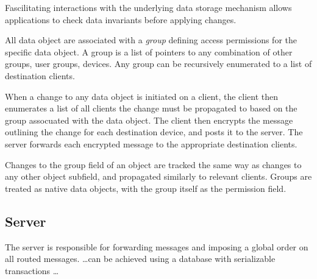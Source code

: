 Fascilitating interactions with the underlying data storage mechanism
allows \name{} applications to check data invariants before applying 
changes.
  

All data object are associated with a \textit{group} defining access 
permissions for the specific data object. A group is a list of pointers 
to any combination of other groups, user groups, devices. Any group
can be recursively enumerated to a list of destination clients. 

When a change to any data object is initiated on a client, the client
then enumerates a list of all clients the change must be propagated to
based on the group assocuated with the data object.
The client then encrypts the message outlining the change for each 
destination device, and posts it to the server. The server forwards
each encrypted message to the appropriate destination clients.

Changes to the group field of an object are tracked the same way as 
changes to any other object subfield, and propagated similarly to 
relevant clients. Groups are treated as \name{} native data objects,
with the group itself as the permission field.  



\subsection{Server}
The server is responsible for forwarding messages and imposing a global 
order on all routed messages. \dots can be achieved using a database with
serializable transactions \dots





